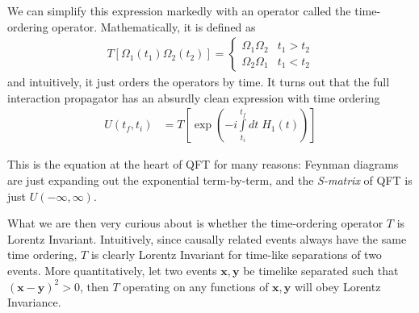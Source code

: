 \documentclass[12pt]{article}
\begin{document}
We can simplify this expression markedly with an operator called the time-ordering operator. Mathematically, it is defined as
\begin{align}
    T\left[ \Omega_1(t_1)\Omega_2(t_2) \right] =
    \begin{cases}
        \Omega_1\Omega_2 & t_1 > t_2\\
        \Omega_2 \Omega_1 & t_1 < t_2
    \end{cases}
\end{align}
and intuitively, it just orders the operators by time. It turns out that the full interaction propagator has an absurdly clean expression with time ordering
\begin{align}
    U(t_f, t_i) &= T\left[ \exp\left( -i\int\limits_{t_i}^{t_f}dt\;H_1(t) \right) \right]
\end{align}

This is the equation at the heart of QFT for many reasons: Feynman diagrams are just expanding out the exponential term-by-term, and the \emph{S-matrix} of QFT is just $U(-\infty, \infty)$. 

What we are then very curious about is whether the time-ordering operator $T$ is Lorentz Invariant. Intuitively, since causally related events always have the same time ordering, $T$ is clearly Lorentz Invariant for time-like separations of two events. More quantitatively, let two events $\mathbf{x}, \mathbf{y}$ be timelike separated such that $(\mathbf{x} - \mathbf{y})^2 > 0$, then $T$ operating on any functions of $\mathbf{x}, \mathbf{y}$ will obey Lorentz Invariance.
\end{document}
